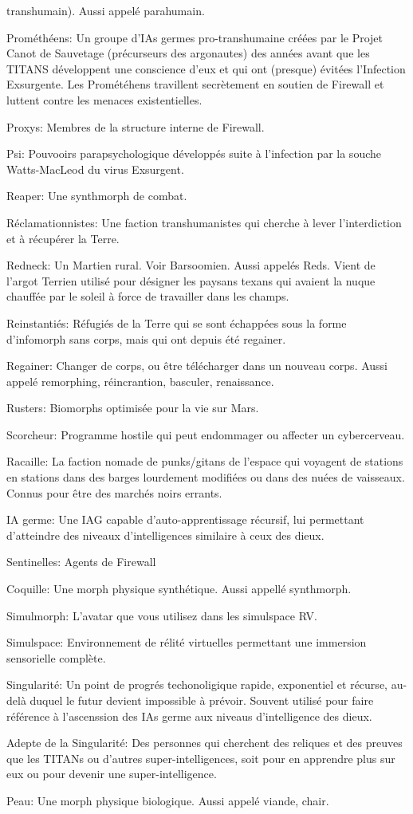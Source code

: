 transhumain). Aussi appelé parahumain. \item Prométhéens: Un groupe d'IAs germes pro-transhumaine créées par le Projet Canot de Sauvetage (précurseurs des argonautes) des années avant que les TITANS développent une conscience d'eux et qui ont (presque) évitées l'Infection Exsurgente. Les Prométéhens travillent secrètement en soutien de Firewall et luttent contre les menaces existentielles. \item Proxys: Membres de la structure interne de Firewall. \item Psi: Pouvooirs parapsychologique développés suite à l'infection par la souche Watts-MacLeod du virus Exsurgent. \item Reaper: Une synthmorph de combat. \item Réclamationnistes: Une faction transhumanistes qui cherche à lever l'interdiction et à récupérer la Terre. \item Redneck: Un Martien rural. Voir Barsoomien. Aussi appelés Reds. Vient de l'argot Terrien utilisé pour désigner les paysans texans qui avaient la nuque chauffée par le soleil à force de travailler dans les champs. \item Reinstantiés: Réfugiés de la Terre qui se sont échappées sous la forme d'infomorph sans corps, mais qui ont depuis été regainer. \item Regainer: Changer de corps, ou être télécharger dans un nouveau corps. Aussi appelé remorphing, réincrantion, basculer, renaissance. \item Rusters: Biomorphs optimisée pour la vie sur Mars. \item Scorcheur: Programme hostile qui peut endommager ou affecter un cybercerveau. \item Racaille: La faction nomade de punks/gitans de l'espace qui voyagent de stations en stations dans des barges lourdement modifiées ou dans des nuées de vaisseaux. Connus pour être des marchés noirs errants. \item IA germe: Une IAG capable d'auto-apprentissage récursif, lui permettant d'atteindre des niveaux d'intelligences similaire à ceux des dieux. \item Sentinelles: Agents de Firewall \item Coquille: Une morph physique synthétique. Aussi appellé synthmorph. \item Simulmorph: L'avatar que vous utilisez dans les simulspace RV. \item Simulspace: Environnement de rélité virtuelles permettant une immersion sensorielle complète. \item Singularité: Un point de progrés techonoligique rapide, exponentiel et récurse, au-delà duquel le futur devient impossible à prévoir. Souvent utilisé pour faire référence à l'ascenssion des IAs germe aux niveaus d'intelligence des dieux. \item Adepte de la Singularité: Des personnes qui cherchent des reliques et des preuves que les TITANs ou d'autres super-intelligences, soit pour en apprendre plus sur eux ou pour devenir une super-intelligence. \item Peau: Une morph physique biologique. Aussi appelé viande, chair. \item 